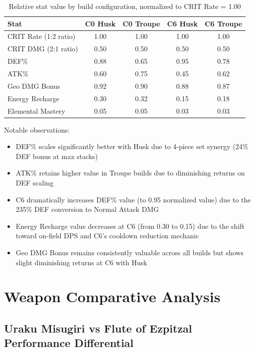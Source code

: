 \documentclass[12pt,a4paper]{article}
\begin{document}
\begin{table}[h]
\centering
\begin{tabular}{lcccc}
\toprule
\textbf{Stat} & \textbf{C0 Husk} & \textbf{C0 Troupe} & \textbf{C6 Husk} & \textbf{C6 Troupe} \\
\midrule
CRIT Rate (1:2 ratio) & 1.00 & 1.00 & 1.00 & 1.00 \\
CRIT DMG (2:1 ratio) & 0.50 & 0.50 & 0.50 & 0.50 \\
DEF\% & 0.88 & 0.65 & 0.95 & 0.78 \\
ATK\% & 0.60 & 0.75 & 0.45 & 0.62 \\
Geo DMG Bonus & 0.92 & 0.90 & 0.88 & 0.87 \\
Energy Recharge & 0.30 & 0.32 & 0.15 & 0.18 \\
Elemental Mastery & 0.05 & 0.05 & 0.03 & 0.03 \\
\bottomrule
\end{tabular}
\caption{Relative stat value by build configuration, normalized to CRIT Rate = 1.00}
\label{tab:stat_priority}
\end{table}

Notable observations:
\begin{itemize}
    \item DEF\% scales significantly better with Husk due to 4-piece set synergy (24\% DEF bonus at max stacks)
    \item ATK\% retains higher value in Troupe builds due to diminishing returns on DEF scaling
    \item C6 dramatically increases DEF\% value (to 0.95 normalized value) due to the 235\% DEF conversion to Normal Attack DMG
    \item Energy Recharge value decreases at C6 (from 0.30 to 0.15) due to the shift toward on-field DPS and C6's cooldown reduction mechanic
    \item Geo DMG Bonus remains consistently valuable across all builds but shows slight diminishing returns at C6 with Husk
\end{itemize}

\section{Weapon Comparative Analysis}

\subsection{Uraku Misugiri vs Flute of Ezpitzal Performance Differential}
\end{document}
